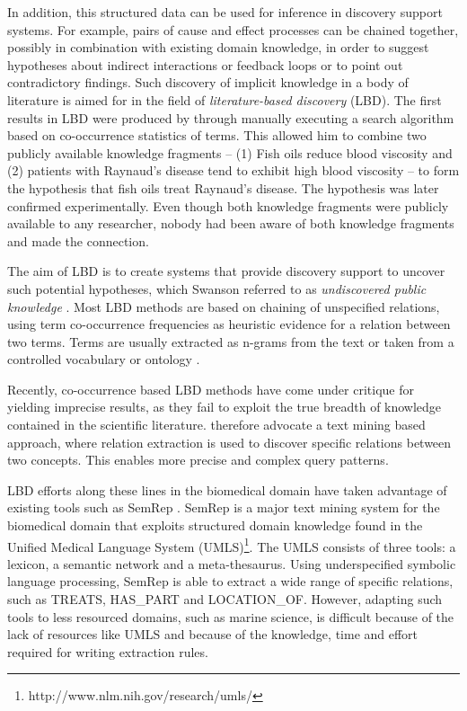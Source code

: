 \documentclass[10pt, a4paper]{article}
\begin{document}
In addition, this structured data can be used for inference in discovery support systems.
For example, pairs of cause and effect processes can be chained together, possibly in combination with existing domain knowledge, in order to suggest hypotheses about indirect interactions or feedback loops or to point out contradictory findings.
Such discovery of implicit knowledge in a body of literature is aimed for in the field of \emph{literature-based discovery} (LBD).
The first results in LBD were produced by  through manually executing a search algorithm based on co-occurrence statistics of terms. 
This allowed him to combine two publicly available knowledge fragments -- (1) Fish oils reduce blood viscosity and (2) patients with Raynaud's disease tend to exhibit high blood viscosity -- to form the hypothesis that fish oils treat Raynaud's disease.
The hypothesis was later confirmed experimentally. 
Even though both knowledge fragments were publicly available to any researcher, nobody had been aware of both knowledge fragments and made the connection.

The aim of LBD is to create systems that provide discovery support to uncover such potential hypotheses, which Swanson referred to as \emph{undiscovered public knowledge} \cite{Swanson1986Undiscovered}.
Most LBD methods are based on chaining of unspecified relations, using term co-occurrence frequencies as heuristic evidence for a relation between two terms.
Terms are usually extracted as n-grams from the text \cite{Lindsay1999LBDLexicalStat} or taken from a controlled vocabulary or ontology \cite{Weeber2001ConceptsInLBD}.

Recently, co-occurrence based LBD methods have come under critique for yielding imprecise results, as they fail to exploit the true breadth of knowledge contained in the scientific literature.
 therefore advocate a text mining based approach, where relation extraction is used to discover specific relations between two concepts.
This enables more precise and complex query patterns.

LBD efforts along these lines in the biomedical domain have taken advantage of existing tools such as SemRep \cite{Rindflesh2003SemRep}.
SemRep is a major text mining system for the biomedical domain that exploits structured domain knowledge found in the Unified Medical Language System (UMLS)\footnote{http://www.nlm.nih.gov/research/umls/}.
The UMLS consists of three tools: a lexicon, a semantic network and a meta-thesaurus. 
Using underspecified symbolic language processing, SemRep is able to extract a wide range of specific relations, such as TREATS, HAS\_PART and LOCATION\_OF.
However, adapting such tools to less resourced domains, such as marine science, is difficult because of the lack of resources like UMLS and because of the knowledge, time and effort required for writing extraction rules.
\end{document}
